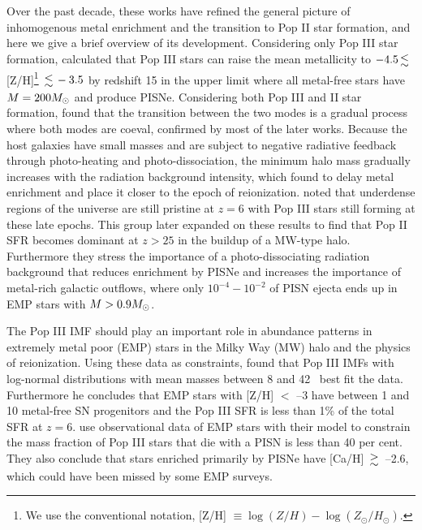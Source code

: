 \documentclass[useAMS,usenatbib]{mn2e}
\begin{document}
Over the past decade, these works have refined the general picture of
inhomogenous metal enrichment and the transition to Pop II star
formation, and here we give a brief overview of its development.
Considering only Pop III star formation, \citeauthor{Yoshida04}
calculated that Pop III stars can raise the mean metallicity to $-4.5
\la$ [Z/H]\footnote{We use the conventional notation, [Z/H] $\equiv
  \log(Z/H) - \log(Z_\odot/H_\odot)$.} $\la -3.5$ by redshift 15 in
the upper limit where all metal-free stars have $M = 200 \Ms$ and
produce PISNe.  Considering both Pop III and II star formation,
\citeauthor{Scannapieco03} found that the transition between the two
modes is a gradual process where both modes are coeval, confirmed by
most of the later works.  Because the host galaxies have small masses
and are subject to negative radiative feedback through photo-heating
and photo-dissociation, the minimum halo mass gradually increases with
the radiation background intensity, which
\citeauthor{Furlanetto05_Reion} found to delay metal enrichment and
place it closer to the epoch of reionization.  \citeauthor{Trenti09}
noted that underdense regions of the universe are still pristine at
$z=6$ with Pop III stars still forming at these late epochs.  This
group later expanded on these results to find that Pop II SFR becomes
dominant at $z>25$ in the buildup of a MW-type halo.  Furthermore they
stress the importance of a photo-dissociating radiation background
that reduces enrichment by PISNe and increases the importance of
metal-rich galactic outflows, where only $10^{-4} - 10^{-2}$ of PISN
ejecta ends up in EMP stars with $M > 0.9 \Ms$.

The Pop III IMF should play an important role in abundance patterns in
extremely metal poor (EMP) stars in the Milky Way (MW) halo and the
physics of reionization.  Using these data as constraints,
\citeauthor{Tumlinson06} found that Pop III IMFs with log-normal
distributions with mean masses between 8 and 42 \Ms~best fit the data.
Furthermore he concludes that EMP stars with [Z/H] $<$ --3 have
between 1 and 10 metal-free SN progenitors and the Pop III SFR is less
than 1\% of the total SFR at $z=6$.  \citeauthor{Karlsson08} use
observational data of EMP stars with their model to constrain the mass
fraction of Pop III stars that die with a PISN is less than 40 per
cent.  They also conclude that stars enriched primarily by PISNe have
[Ca/H] $\ga$ --2.6, which could have been missed by some EMP
surveys.

%
\end{document}

